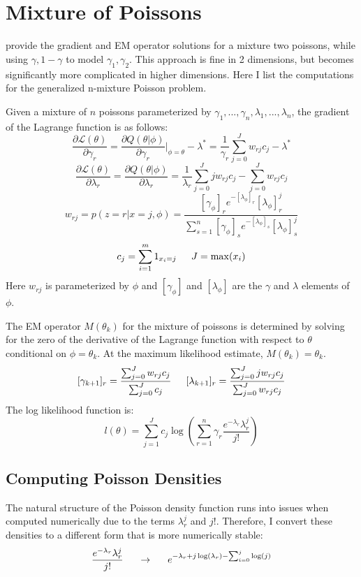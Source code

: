 \documentclass[letter,12pt]{article}
\begin{document}
\section{Mixture of Poissons} \label{section:poisson}

\cite{jamshidianj97} provide the gradient and EM operator solutions for a mixture two poissons, while using $\gamma,1-\gamma$ to model $\gamma_1,\gamma_2$.  This approach is fine in 2 dimensions, but becomes significantly more complicated in higher dimensions.  Here I list the computations for the generalized n-mixture Poisson problem.

Given a mixture of $n$ poissons parameterized by $\gamma_1,...,\gamma_n,\lambda_1,...,\lambda_n$, the gradient of the Lagrange function is as follows:
\[
\frac{\partial \mathcal{L}(\theta)}{\partial \gamma_r}
=
\frac{\partial Q(\theta|\phi)}{\partial \gamma_r}|_{\phi=\theta} - \lambda^*
=
\frac{1}{\gamma_r} \sum_{j=0}^{J}w_{rj}c_j - \lambda^*
\]
\[
\frac{\partial \mathcal{L}(\theta)}{\partial \lambda_r}
=
\frac{\partial Q(\theta|\phi)}{\partial \lambda_r}
=
\frac{1}{\lambda_r} \sum_{j=0}^{J}jw_{rj}c_j - \sum_{j=0}^{J}w_{rj}c_j
\]
\[
w_{rj}=p(z=r|x=j,\phi)=\frac{[\gamma_{\phi}]_r e^{-[\lambda_{\phi}]_r}[\lambda_{\phi}]_r^j}{\sum_{s=1}^{n}[\gamma_{\phi}]_s e^{-[\lambda_{\phi}]_s}[\lambda_{\phi}]_s^j}
\]
\[
c_j = \sum_{i=1}^{m}1_{x_i=j}
\indent
J = \max(x_i)
\]
Here $w_{rj}$ is parameterized by $\phi$ and $[\gamma_{\phi}]$ and $[\lambda_{\phi}]$ are the $\gamma$ and $\lambda$ elements of $\phi$.

The EM operator $M(\theta_k)$ for the mixture of poissons is determined by solving for the zero of the derivative of the Lagrange function with respect to $\theta$ conditional on $\phi=\theta_k$.  At the maximum likelihood estimate, $M(\theta_k)=\theta_k$.
\[
[\gamma_{k+1}]_r = \frac{\sum_{j=0}^{J}w_{rj}c_j}{\sum_{j=0}^{J}c_j}
\indent
[\lambda_{k+1}]_r = \frac{\sum_{j=0}^{J}jw_{rj}c_j}{\sum_{j=0}^{J}w_{rj}c_j}
\]
The log likelihood function is:
\[
l(\theta) = \sum_{j=1}^{J}c_j\log\left({\sum_{r=1}^{n}\gamma_r\frac{e^{-\lambda_r}\lambda_r^j}{j!}}\right)
\]

\subsection{Computing Poisson Densities}

The natural structure of the Poisson density function runs into issues when computed numerically due to the terms $\lambda_r^j$ and $j!$.  Therefore, I convert these densities to a different form that is more numerically stable:
\[
\frac{e^{-\lambda_r}\lambda_r^j}{j!}
\indent
\rightarrow
\indent
e^{-\lambda_r+j\log(\lambda_r)-\sum_{i=0}^{j}\log(j)}
\]
\end{document}
